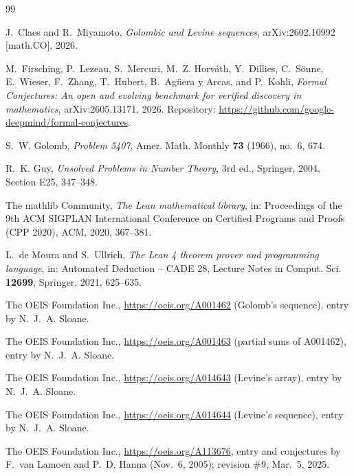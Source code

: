 \documentclass[11pt]{amsart}
\theoremstyle{plain}
\theoremstyle{definition}
\begin{document}
\begin{thebibliography}{99}

J.~Claes and R.~Miyamoto, \emph{Golombic and Levine sequences}, arXiv:2602.10992 [math.CO], 2026.

M.~Firsching, P.~Lezeau, S.~Mercuri, M.~Z. Horv\'ath, Y.~Dillies, C.~S\"onne, E.~Wieser, F.~Zhang, T.~Hubert, B.~Ag\"uera y Arcas, and P.~Kohli, \emph{Formal Conjectures: An open and evolving benchmark for verified discovery in mathematics}, arXiv:2605.13171, 2026. Repository: \url{https://github.com/google-deepmind/formal-conjectures}.

S.~W. Golomb, \emph{Problem 5407}, Amer. Math. Monthly \textbf{73} (1966), no.~6, 674.

R.~K. Guy, \emph{Unsolved Problems in Number Theory}, 3rd ed., Springer, 2004, Section E25, 347--348.

The mathlib Community, \emph{The Lean mathematical library}, in: Proceedings of the 9th ACM SIGPLAN International Conference on Certified Programs and Proofs (CPP 2020), ACM, 2020, 367--381.

L.~de Moura and S.~Ullrich, \emph{The Lean 4 theorem prover and programming language}, in: Automated Deduction -- CADE 28, Lecture Notes in Comput. Sci. \textbf{12699}, Springer, 2021, 625--635.

The OEIS Foundation Inc., \url{https://oeis.org/A001462} (Golomb's sequence), entry by N.~J.~A. Sloane.

The OEIS Foundation Inc., \url{https://oeis.org/A001463} (partial sums of A001462), entry by N.~J.~A. Sloane.

The OEIS Foundation Inc., \url{https://oeis.org/A014643} (Levine's array), entry by N.~J.~A. Sloane.

The OEIS Foundation Inc., \url{https://oeis.org/A014644} (Levine's sequence), entry by N.~J.~A. Sloane.

The OEIS Foundation Inc., \url{https://oeis.org/A113676}, entry and conjectures by F.~van Lamoen and P.~D. Hanna (Nov.~6, 2005); revision \#9, Mar.~5, 2025.

\end{thebibliography}
\end{document}

